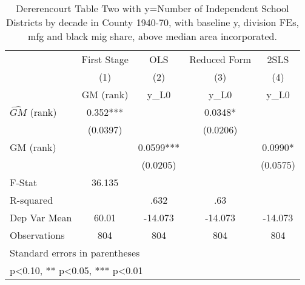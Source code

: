 \begin{table}[htbp]\centering
\def\sym#1{\ifmmode^{#1}\else\(^{#1}\)\fi}
\caption{Dererencourt Table Two with y=Number of Independent School Districts by decade in County 1940-70, with baseline y, division FEs, mfg and black mig share, above median area incorporated.}
\begin{tabular}{l*{4}{c}}
\toprule
                    & First Stage   &         OLS   &Reduced Form   &        2SLS   \\
                    &\multicolumn{1}{c}{(1)}&\multicolumn{1}{c}{(2)}&\multicolumn{1}{c}{(3)}&\multicolumn{1}{c}{(4)}\\
                    &\multicolumn{1}{c}{GM  (rank)}&\multicolumn{1}{c}{y\_L0}&\multicolumn{1}{c}{y\_L0}&\multicolumn{1}{c}{y\_L0}\\
\midrule
$\hat{GM}$ (rank)   &       0.352***&               &      0.0348*  &               \\
                    &    (0.0397)   &               &    (0.0206)   &               \\
\addlinespace
GM  (rank)          &               &      0.0599***&               &      0.0990*  \\
                    &               &    (0.0205)   &               &    (0.0575)   \\
\midrule
F-Stat              &      36.135   &               &               &               \\
R-squared           &               &        .632   &         .63   &               \\
Dep Var Mean        &       60.01   &     -14.073   &     -14.073   &     -14.073   \\
Observations        &         804   &         804   &         804   &         804   \\
\bottomrule
\multicolumn{5}{l}{\footnotesize Standard errors in parentheses}\\
\multicolumn{5}{l}{\footnotesize * p<0.10, ** p<0.05, *** p<0.01}\\
\end{tabular}
\end{table}
